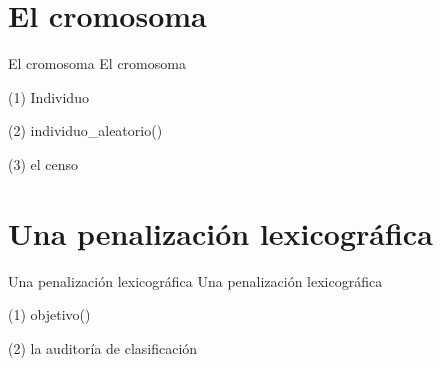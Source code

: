 \section{El cromosoma}

\begin{frame}{El cromosoma}
El cromosoma
\end{frame}

\begin{frame}[fragile]{(1) Individuo}

\end{frame}

\begin{frame}[fragile]{(2) individuo\_aleatorio()}

\end{frame}

\begin{frame}[fragile]{(3) el censo}

\end{frame}


\section{Una penalización lexicográfica}

\begin{frame}{Una penalización lexicográfica}
Una penalización lexicográfica
\end{frame}

\begin{frame}[fragile]{(1) objetivo()}

\end{frame}

\begin{frame}[fragile]{(2) la auditoría de clasificación}

\end{frame}

